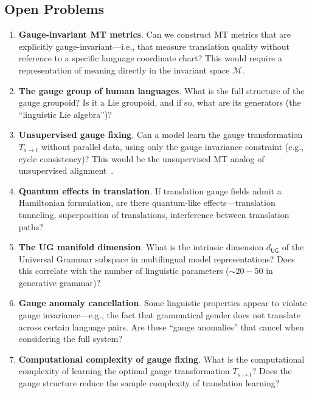 \documentclass[12pt,a4paper]{article}
\theoremstyle{remark}
\newcommand{\M}{\mathcal{M}}
\newcommand{\UG}{\textsf{UG}}
\begin{document}
\subsection{Open Problems}

\begin{enumerate}[leftmargin=*, label=(\arabic*)]
  \item \textbf{Gauge-invariant MT metrics}. Can we construct MT metrics
        that are explicitly gauge-invariant---i.e., that measure translation
        quality without reference to a specific language coordinate chart?
        This would require a representation of meaning directly in the
        invariant space $\M$.
  \item \textbf{The gauge group of human languages}. What is the full
        structure of the gauge groupoid? Is it a Lie groupoid, and if so,
        what are its generators (the ``linguistic Lie algebra'')?
  \item \textbf{Unsupervised gauge fixing}. Can a model learn the gauge
        transformation $T_{s\to t}$ without parallel data, using only
        the gauge invariance constraint (e.g., cycle consistency)?
        This would be the unsupervised MT analog of unsupervised
        alignment~\cite{conneau2018word}.
  \item \textbf{Quantum effects in translation}. If translation gauge
        fields admit a Hamiltonian formulation, are there quantum-like
        effects---translation tunneling, superposition of translations,
        interference between translation paths?
  \item \textbf{The UG manifold dimension}. What is the intrinsic
        dimension $d_{\UG}$ of the Universal Grammar subspace in
        multilingual model representations? Does this correlate with
        the number of linguistic parameters ($\sim 20-50$ in
        generative grammar)?
  \item \textbf{Gauge anomaly cancellation}. Some linguistic properties
        appear to violate gauge invariance---e.g., the fact that
        grammatical gender does not translate across certain language
        pairs. Are these ``gauge anomalies'' that cancel when considering
        the full system?
  \item \textbf{Computational complexity of gauge fixing}. What is the
        computational complexity of learning the optimal gauge
        transformation $T_{s\to t}$? Does the gauge structure reduce
        the sample complexity of translation learning?
\end{enumerate}
\end{document}
